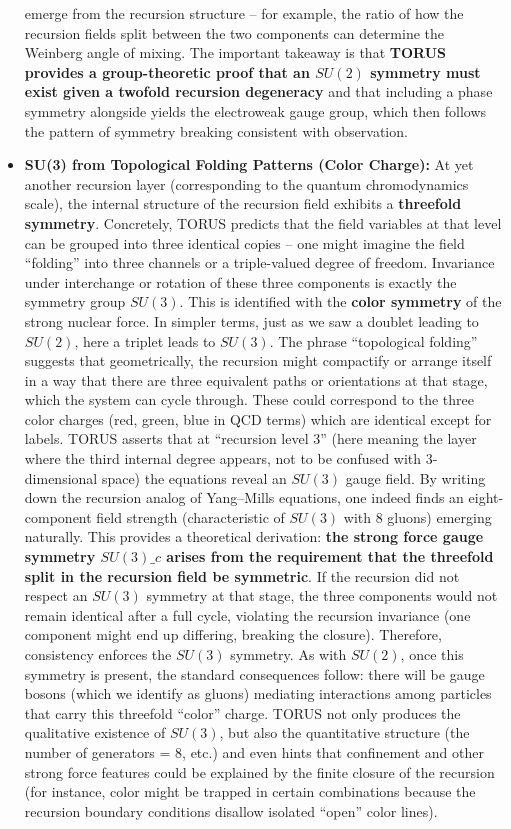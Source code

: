 \documentclass[]{article}
\begin{document}
\begin{itemize}
  emerge from the recursion structure -- for example, the ratio of how
  the recursion fields split between the two components can determine
  the Weinberg angle of mixing​. The important takeaway is that
  \textbf{TORUS provides a group-theoretic proof that an $SU(2)$
  symmetry must exist given a twofold recursion degeneracy} and that
  including a phase symmetry alongside yields the electroweak gauge
  group, which then follows the pattern of symmetry breaking consistent
  with observation.
\item
  \textbf{SU(3) from Topological Folding Patterns (Color Charge):} At
  yet another recursion layer (corresponding to the quantum
  chromodynamics scale), the internal structure of the recursion field
  exhibits a \textbf{threefold symmetry}. Concretely, TORUS predicts
  that the field variables at that level can be grouped into three
  identical copies -- one might imagine the field ``folding'' into three
  channels or a triple-valued degree of freedom​. Invariance under
  interchange or rotation of these three components is exactly the
  symmetry group $SU(3)$. This is identified with the \textbf{color
  symmetry} of the strong nuclear force. In simpler terms, just as we
  saw a doublet leading to $SU(2)$, here a triplet leads to $SU(3)$.
  The phrase ``topological folding'' suggests that geometrically, the
  recursion might compactify or arrange itself in a way that there are
  three equivalent paths or orientations at that stage, which the system
  can cycle through. These could correspond to the three color charges
  (red, green, blue in QCD terms) which are identical except for labels.
  TORUS asserts that at ``recursion level 3'' (here meaning the layer
  where the third internal degree appears, not to be confused with
  3-dimensional space) the equations reveal an $SU(3)$ gauge field​.
  By writing down the recursion analog of Yang--Mills equations, one
  indeed finds an eight-component field strength (characteristic of
  $SU(3)$ with 8 gluons) emerging naturally​. This provides a
  theoretical derivation: \textbf{the strong force gauge symmetry
  $SU(3)\_c$ arises from the requirement that the threefold split in
  the recursion field be symmetric}. If the recursion did not respect an
  $SU(3)$ symmetry at that stage, the three components would not
  remain identical after a full cycle, violating the recursion
  invariance (one component might end up differing, breaking the
  closure). Therefore, consistency enforces the $SU(3)$ symmetry​. As
  with $SU(2)$, once this symmetry is present, the standard
  consequences follow: there will be gauge bosons (which we identify as
  gluons) mediating interactions among particles that carry this
  threefold ``color'' charge. TORUS not only produces the qualitative
  existence of $SU(3)$, but also the quantitative structure (the
  number of generators = 8, etc.) and even hints that confinement and
  other strong force features could be explained by the finite closure
  of the recursion (for instance, color might be trapped in certain
  combinations because the recursion boundary conditions disallow
  isolated ``open'' color lines).
\end{itemize}
\end{document}

